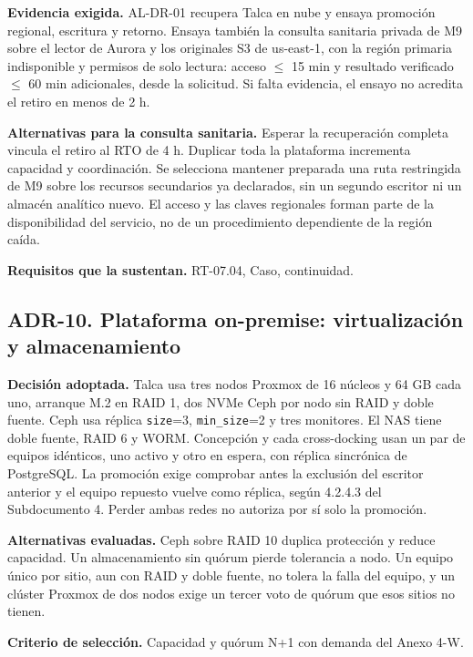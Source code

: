 \textbf{Evidencia exigida.} AL-DR-01 recupera Talca en nube y ensaya promoción regional, escritura y retorno. Ensaya también la consulta sanitaria privada de M9 sobre el lector de Aurora y los originales S3 de us-east-1, con la región primaria indisponible y permisos de solo lectura: acceso $\leq$ 15 min y resultado verificado $\leq$ 60 min adicionales, desde la solicitud. Si falta evidencia, el ensayo no acredita el retiro en menos de 2 h.

\textbf{Alternativas para la consulta sanitaria.} Esperar la recuperación completa vincula el retiro al RTO de 4 h. Duplicar toda la plataforma incrementa capacidad y coordinación. Se selecciona mantener preparada una ruta restringida de M9 sobre los recursos secundarios ya declarados, sin un segundo escritor ni un almacén analítico nuevo. El acceso y las claves regionales forman parte de la disponibilidad del servicio, no de un procedimiento dependiente de la región caída.

\textbf{Requisitos que la sustentan.} RT-07.04, Caso, continuidad.

\subsection*{ADR-10. Plataforma on-premise: virtualización y almacenamiento}
\label{sub:adr-10}
\textbf{Decisión adoptada.} Talca usa tres nodos Proxmox de 16 núcleos y 64 GB cada uno, arranque M.2 en RAID 1, dos NVMe Ceph por nodo sin RAID y doble fuente. Ceph usa réplica \texttt{size}=3, \texttt{min\_size}=2 y tres monitores. El NAS tiene doble fuente, RAID 6 y WORM. Concepción y cada cross-docking usan un par de equipos idénticos, uno activo y otro en espera, con réplica sincrónica de PostgreSQL. La promoción exige comprobar antes la exclusión del escritor anterior y el equipo repuesto vuelve como réplica, según 4.2.4.3 del Subdocumento 4. Perder ambas redes no autoriza por sí solo la promoción.

\textbf{Alternativas evaluadas.} Ceph sobre RAID 10 duplica protección y reduce capacidad. Un almacenamiento sin quórum pierde tolerancia a nodo. Un equipo único por sitio, aun con RAID y doble fuente, no tolera la falla del equipo, y un clúster Proxmox de dos nodos exige un tercer voto de quórum que esos sitios no tienen.

\textbf{Criterio de selección.} Capacidad y quórum N+1 con demanda del Anexo 4-W.

